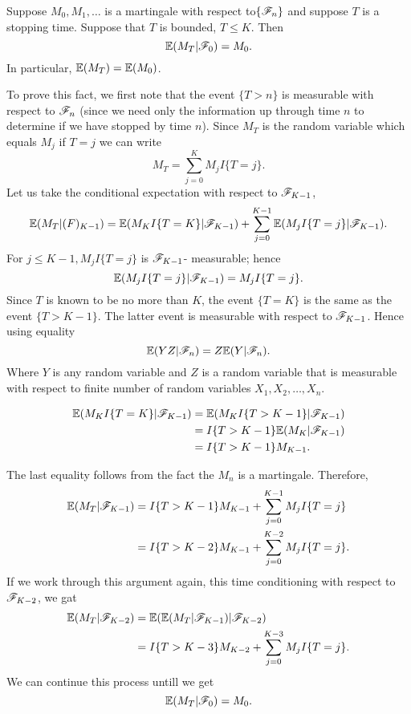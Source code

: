 \documentclass[a4paper,english,10pt]{article}
\begin{document}
\begin{thm} 
Suppose $M_0,M_1,\dots $ is a martingale with respect to$\{\mathscr{F}_n\}$ and suppose $T$ is a stopping time. Suppose that $T$ is bounded, $T\leq K$. Then
\begin{equation*}
\mathbb{E}(M_T|\mathscr{F}_0)=M_0.
\end{equation*}
In particular, $\mathbb{E}(M_T)=\mathbb{E}(M_0)$.
 \end{thm}
To prove this fact, we first note that the event $\{T>n\}$ is measurable with respect to $\mathscr{F}_n$ (since we need only the information up through time $n$ to determine if we have stopped by time $n$). Since $M_T$ is the random variable which equals $M_j$ if $T=j$ we can write
\begin{equation*}
M_T = \sum_{j=0}^K M_j I\{T=j\}.
\end{equation*}
Let us take the conditional expectation with respect to $\mathscr{F}_{K-1}$,
\begin{equation*}
\mathbb{E}(M_T|\mathcal(F)_{K-1})=\mathbb{E}(M_KI\{T=K\}|\mathscr{F}_{K-1})+\sum_{j=0}^{K-1} \mathbb{E}(M_jI\{T=j\}|\mathscr{F}_{K-1}).
\end{equation*}
For $j\leq K-1, M_jI\{T=j\}$ is $\mathscr{F}_{K-1}$- measurable; hence
\begin{equation*}
\mathbb{E}(M_jI\{T=j\}|\mathscr{F}_{K-1})=M_jI\{T=j\}.
\end{equation*}
Since $T$ is known to be no more than $K$, the event $\{T=K\}$ is the same as the event $\{T>K-1\}$. The latter event is measurable with respect to $\mathscr{F}_{K-1}$. Hence using equality
\begin{equation*}
\mathbb{E}(YZ|\mathscr{F}_n)= Z\mathbb{E}(Y|\mathscr{F}_n).
\end{equation*}
Where $Y$ is any random variable and $Z$ is a random variable that is measurable with respect to finite number of random variables $X_1,X_2,\dots,X_n$.

\begin{align*}
\mathbb{E}(M_KI\{T=K\}|\mathscr{F}_{K-1}) &=\mathbb{E}(M_KI\{T>K-1\}|\mathscr{F}_{K-1})\\
&=I\{T>K-1\}\mathbb{E}(M_K|\mathscr{F}_{K-1})\\
&=I\{T>K-1\}M_{K-1}.
\end{align*}

The last equality follows from the fact the $M_n$ is a martingale. Therefore,
\begin{align*}
\mathbb{E}(M_T|\mathscr{F}_{K-1}) &=I\{T>K-1\}M_{K-1}+\sum_{j=0}^{K-1}M_jI\{T=j\}\\
&=I\{T>K-2\}M_{K-1}+\sum_{j=0}^{K-2}M_jI\{T=j\}.
\end{align*}
If we work through this argument again, this time conditioning with respect to $\mathscr{F}_{K-2}$, we gat
\begin{align*}
\mathbb{E}(M_T|\mathscr{F}_{K-2}) &=\mathbb{E}(\mathbb{E}(M_T|\mathscr{F}_{K-1})|\mathscr{F}_{K-2})\\
&=I\{T>K-3\}M_{K-2}+\sum_{j=0}^{K-3}M_jI\{T=j\}.
\end{align*}
We can continue this process untill we get
\begin{equation*}
\mathbb{E}(M_T|\mathscr{F}_0)=M_0.
\end{equation*}
\end{document}
